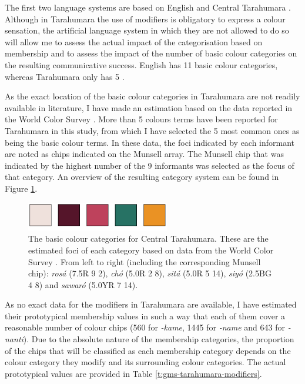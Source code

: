 The first two language systems are based on English
\citep{sturges95location} and Central Tarahumara
\citep{burgress83tarahumara}. Although in Tarahumara the use of
modifiers is obligatory to express a colour sensation, the artificial
language system in which they are not allowed to do so will allow me
to assess the actual impact of the categorisation based on membership
and to assess the impact of the number of basic colour categories on
the resulting communicative success. English has 11 basic colour
categories, whereas Tarahumara only has 5 \citep{kay08number}.

As the exact location of the basic colour categories in Tarahumara are
not readily available in literature, I have made an estimation
based on the data reported in the World Color Survey
\citep{kay10world}. More than 5 colours terms have been reported for
Tarahumara in this study, from which I have selected the 5 most common
ones as being the basic colour terms. In these data, the foci
indicated by each informant are noted as chips indicated on the
Munsell array. The Munsell chip that was indicated by the highest
number of the 9 informants was selected as the focus of that
category. An overview of the resulting category system can be found in
Figure \ref{f:gms-tarahumara-basic}.

\begin{figure}[htpb]
  \centering
  \includegraphics[height=1.25cm]{./graded-membership/figures/tarahumara-basic-categories.pdf}
  \caption[The basic colour categories for Central Tarahumara]{The
    basic colour categories for Central Tarahumara. These are the
    estimated foci of each category based on data from the World Color
    Survey \citep{kay10world}. From left to right (including the
    corresponding Munsell chip): \textit{ros\'a} (7.5R 9 2), \textit{ch\'o}
    (5.0R 2 8), \textit{sit\'a} (5.0R 5 14), \textit{siy\'o} (2.5BG 4 8) and
    \textit{sawar\'o} (5.0YR 7 14).}
  \label{f:gms-tarahumara-basic}
\end{figure}

As no exact data for the modifiers in Tarahumara are available, I have
estimated their prototypical membership values in such a way that each
of them cover a reasonable number of colour chips (560 for \textit{-kame},
1445 for \textit{-name} and 643 for \textit{-nanti}). Due to the absolute
nature of the membership categories, the proportion of the chips that
will be classified as each membership category depends on the colour
category they modify and its surrounding colour categories. The actual
prototypical values are provided in Table
\ref{t:gms-tarahumara-modifiers}.


